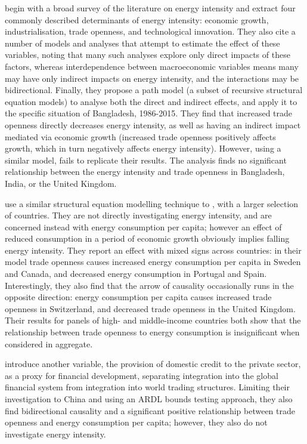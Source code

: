\documentclass[12pt,a4paper]{article}
\begin{document}
\cite{panHowIndustrializationTrade2019} begin with a broad survey of the literature on energy intensity and extract four commonly described determinants of energy intensity: economic growth, industrialisation, trade openness, and technological innovation.
They also cite a number of models and analyses that attempt to estimate the effect of these variables, noting that many such analyses explore only direct impacts of these factors, whereas interdependence between macroeconomic variables means many may have only indirect impacts on energy intensity, and the interactions may be bidirectional.
Finally, they propose a path model (a subset of recursive structural equation models) to analyse both the direct and indirect effects, and apply it to the specific situation of Bangladesh, 1986-2015.
They find that increased trade openness directly decreases energy intensity, as well as having an indirect impact mediated via economic growth (increased trade openness positively affects growth, which in turn negatively affects energy intensity).
However, using a similar model, \cite{siardPathModelEnergy2020} fails to replicate their results. The analysis finds no significant relationship between the energy intensity and trade openness in Bangladesh, India, or the United Kingdom.

\cite{tibaIncomeTradeOpenness2018} use a similar structural equation modelling technique to \cite{panHowIndustrializationTrade2019}, with a larger selection of countries.
They are not directly investigating energy intensity, and are concerned instead with energy consumption per capita; however an effect of reduced consumption in a period of economic growth obviously implies falling energy intensity.
They report an effect with mixed signs across countries: in their model trade openness causes increased energy consumption per capita in Sweden and Canada, and decreased energy consumption in Portugal and Spain.
Interestingly, they also find that the arrow of causality occasionally runs in the opposite direction: energy consumption per capita causes increased trade openness in Switzerland, and decreased trade openness in the United Kingdom.
Their results for panels of high- and middle-income countries both show that the relationship between trade openness to energy consumption is insignificant when considered in aggregate. 

\cite{shahbazDynamicLinksEnergy2013} introduce another variable, the provision of domestic credit to the private sector, as a proxy for financial development, separating integration into the global financial system from integration into world trading structures. Limiting their investigation to China and using an ARDL bounds testing approach, they also find bidirectional causality and a significant positive relationship between trade openness and energy consumption per capita; however, they also do not investigate energy intensity.
\end{document}
